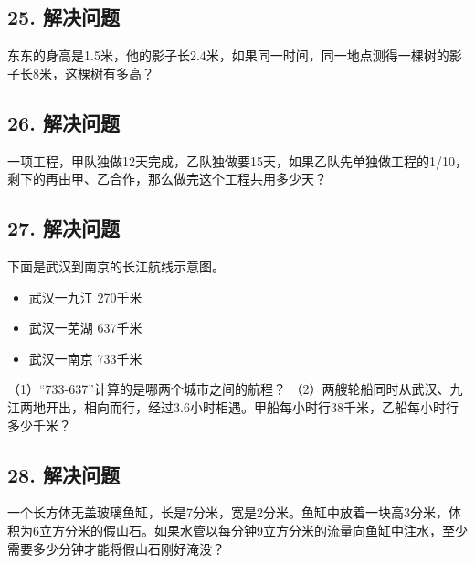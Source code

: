 \documentclass[12pt]{article}
\begin{document}
\subsection*{25. 解决问题}
东东的身高是1.5米，他的影子长2.4米，如果同一时间，同一地点测得一棵树的影子长8米，这棵树有多高？

\subsection*{26. 解决问题}
一项工程，甲队独做12天完成，乙队独做要15天，如果乙队先单独做工程的1/10，剩下的再由甲、乙合作，那么做完这个工程共用多少天？

\subsection*{27. 解决问题}
下面是武汉到南京的长江航线示意图。
\begin{itemize}
    \item 武汉一九江 270千米
    \item 武汉一芜湖 637千米
    \item 武汉一南京 733千米
\end{itemize}
（1）“733-637”计算的是哪两个城市之间的航程？
（2）两艘轮船同时从武汉、九江两地开出，相向而行，经过3.6小时相遇。甲船每小时行38千米，乙船每小时行多少千米？

\subsection*{28. 解决问题}
一个长方体无盖玻璃鱼缸，长是7分米，宽是2分米。鱼缸中放着一块高3分米，体积为6立方分米的假山石。如果水管以每分钟9立方分米的流量向鱼缸中注水，至少需要多少分钟才能将假山石刚好淹没？
\end{document}
